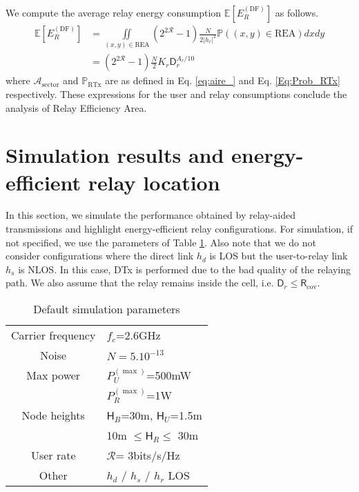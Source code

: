 \documentclass[journal]{IEEEtran}
\theoremstyle{definition}
\begin{document}
We compute the average relay energy consumption $\mathbb{E} \left[E_{R}^{(\text{DF})}\right]$ as follows. 
\begin{align}
\mathbb{E} \left[E_{R}^{(\text{DF})}\right] 
&= \underset{(x,y) \in \text{REA}}{\iint} \left(2^{2\mathcal{R}}-1\right) \frac{N}{2 \vert h_r \vert^2} \mathbb{P}\left((x,y) \in \text{REA}\right)  dx dy \nonumber \\
& = \left(2^{2\mathcal{R}}-1\right) \frac{N}{2} K_r \mathsf{D}_r ^{A_r/10} 
\end{align}
where $\mathcal{A}_{\text{sector}}$ and $\mathbb{P}_{\text{RTx}}$ are as defined in Eq. \eqref{eq:aire_} and Eq. \eqref{Eq:Prob_RTx} respectively.
These expressions for the user and relay consumptions conclude the analysis of Relay Efficiency Area.





\section{Simulation results and energy-efficient relay location}
\label{sec:simulation}

In this section, we simulate the performance obtained by relay-aided transmissions and highlight energy-efficient relay configurations.
For simulation, if not specified, we use the parameters of Table \ref{sim_param}. 
Also note that we do not consider configurations where the direct link $h_d$ is LOS but the user-to-relay link $h_s$ is NLOS. In this case, DTx is performed due to the bad quality of the relaying path. We also assume that the relay remains inside the cell, i.e. $\mathsf{D}_r \leq \mathsf{R}_{\text{cov}}$.

\begin{table}
\centering \small{ \begin{tabular}{|c|l|} 
\hline
Carrier frequency & $f_c$=2.6GHz   \\
Noise & $N=5.10^{-13}$ \\
Max power & $P_U^{(\max)}$=500mW \\
& $P_R^{(\max)}$=1W  \\
Node heights & $\mathsf{H}_{B}$=30m, $\mathsf{H}_{U}$=1.5m \\
 & 10m $\leq \mathsf{H}_{R} \leq $ 30m \\
 User rate & $\mathcal{R}$= 3bits/s/Hz \\
 Other & $h_d$ / $h_s$ / $h_r$ LOS \\
\hline
\end{tabular}}
\caption{Default simulation parameters}  \label{sim_param}
\end{table}
\end{document}

